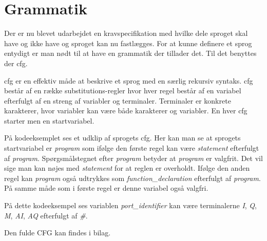 \section{Grammatik}\label{sec:Gramatik}

Der er nu blevet udarbejdet en kravspecifikation med hvilke dele sproget skal have og ikke have og sproget kan nu fastlægges. For at kunne definere et sprog entydigt er man nødt til at have en grammatik der tillader det. Til det benyttes der \gls{cfg}.

\gls{cfg} er en effektiv måde at beskrive et sprog med en særlig rekursiv syntaks. \gls{cfg} består af en række substitutions-regler hvor hver regel består af en variabel efterfulgt af en streng af variabler og terminaler. Terminaler er konkrete karakterer, hvor variabler kan være både karakterer og variabler. En hver \gls{cfg} starter men en startvariabel.

På kodeeksemplet ses et udklip af sprogets \gls{cfg}. Her kan man se at sprogets startvariabel er \textit{program} som ifølge den første regel kan være \textit{statement} efterfulgt af \textit{program}. Spørgsmålstegnet efter \textit{program} betyder at \textit{program} er valgfrit. Det vil sige man kan nøjes med \textit{statement} for at reglen er overholdt. Ifølge den anden regel kan \textit{program} også udtrykkes som \textit{function\_declaration} efterfulgt af \textit{program}. På samme måde som i første regel er denne variabel også valgfri.


\noindent På dette kodeeksempel ses variablen \textit{port\_identifier} kan være terminalerne \textit{I}, \textit{Q}, \textit{M}, \textit{AI}, \textit{AQ} efterfulgt af \textit{\#}.

\noindent Den fulde CFG kan findes i bilag. 